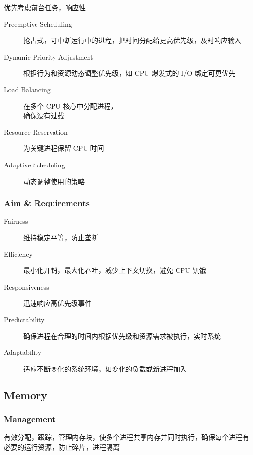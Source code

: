 \documentclass[11pt,journal,compsoc]{IEEEtran}
\begin{document}
优先考虑前台任务，响应性

\begin{description}
    \item[Preemptive Scheduling] 抢占式，可中断运行中的进程，把时间分配给更高优先级，及时响应输入

    \item[Dynamic Priority Adjustment] 根据行为和资源动态调整优先级，如 CPU 爆发式的 I/O 绑定可更优先

    \item[Load Balancing] 在多个 CPU 核心中分配进程，\\ 确保没有过载

    \item[Resource Reservation] 为关键进程保留 CPU 时间

    \item[Adaptive Scheduling] 动态调整使用的策略
\end{description}


\subsubsection{Aim \& Requirements}

\begin{description}
    \item[Fairness] 维持稳定平等，防止垄断

    \item[Efficiency] 最小化开销，最大化吞吐，减少上下文切换，避免 CPU 饥饿

    \item[Responsiveness] 迅速响应高优先级事件

    \item[Predictability] 确保进程在合理的时间内根据优先级和资源需求被执行，实时系统

    \item[Adaptability] 适应不断变化的系统环境，如变化的负载或新进程加入
\end{description}


\subsection{Memory}


\subsubsection{Management}

有效分配，跟踪，管理内存块，使多个进程共享内存并同时执行，确保每个进程有必要的运行资源，防止碎片，进程隔离
\end{document}
